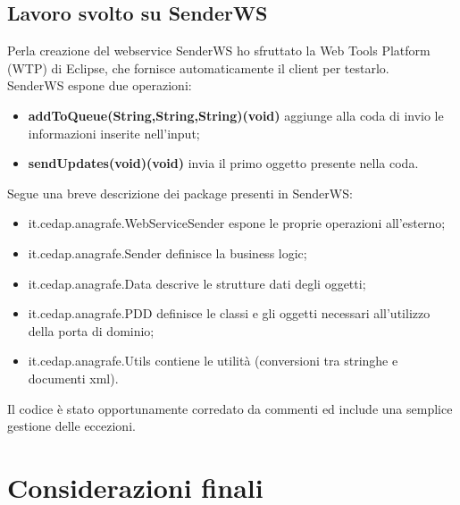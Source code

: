 \documentclass[a4paper]{article}
\begin{document}
\subsection{Lavoro svolto su SenderWS}
Perla creazione del webservice SenderWS ho sfruttato la Web Tools Platform (WTP) di Eclipse, che fornisce automaticamente il client per testarlo.
\\
SenderWS espone due operazioni:
\begin{itemize}
	\item \textbf{addToQueue(String,String,String)(void)} aggiunge alla coda di invio le informazioni inserite nell'input;
    \item \textbf{sendUpdates(void)(void)} invia il primo oggetto presente nella coda.
\end{itemize}
Segue una breve descrizione dei package presenti in SenderWS:
\begin{itemize}
	\item it.cedap.anagrafe.WebServiceSender espone le proprie operazioni all'esterno;
    \item it.cedap.anagrafe.Sender definisce la business logic;
    \item it.cedap.anagrafe.Data descrive le strutture dati degli oggetti;
    \item it.cedap.anagrafe.PDD definisce le classi e gli oggetti necessari all'utilizzo della porta di dominio;
	\item it.cedap.anagrafe.Utils contiene le utilità (conversioni tra stringhe e documenti xml).
\end{itemize}
Il codice è stato opportunamente corredato da commenti ed include una semplice gestione delle eccezioni.

\newpage

\section{Considerazioni finali}
\end{document}
